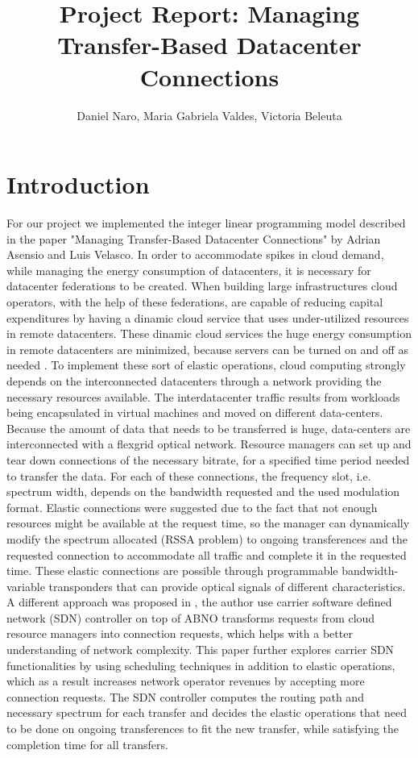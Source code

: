 \documentclass[11pt,a4paper]{article}
\title{Project Report: Managing Transfer-Based Datacenter Connections}
\author{Daniel Naro, Maria Gabriela Valdes, Victoria Beleuta}
\begin{document}
\maketitle
\section{Introduction}

For our project we implemented the integer linear programming model described in the paper "Managing Transfer-Based Datacenter Connections" by Adrian Asensio and Luis Velasco. In order to accommodate spikes in cloud demand, while managing the energy consumption of datacenters, it is necessary for datacenter federations to be created. When building large infrastructures cloud operators, with the help of these federations, are capable of reducing capital expenditures by having a dinamic cloud service that uses under-utilized resources in remote datacenters. These dinamic cloud services the huge energy consumption in remote datacenters are minimized, because servers can be turned on and off as needed . To implement these sort of elastic operations, cloud computing strongly depends on the interconnected datacenters through a network providing the necessary resources available. The interdatacenter traffic results from workloads being encapsulated in virtual machines and moved on different data-centers. Because the amount of data that needs to be transferred is huge, data-centers are interconnected with a flexgrid optical network. Resource managers can set up and tear down connections of the necessary bitrate, for a specified time period needed to transfer the data. For each of these connections, the frequency slot, i.e. spectrum width, depends on the bandwidth requested and the used modulation format. Elastic connections were suggested due to the fact that not enough resources might be available at the request time, so the manager can dynamically modify the spectrum allocated (RSSA problem)  to ongoing transferences and the requested connection to accommodate all traffic and complete it in the requested time. These elastic connections are possible through programmable bandwidth-variable transponders that can provide optical signals of different characteristics.\\

A different approach was proposed in \cite{1}, the author use carrier software defined network (SDN) controller on top of ABNO transforms requests from cloud resource managers into connection requests, which helps with a better understanding of network complexity. This paper further explores carrier SDN functionalities by using scheduling techniques in addition to elastic operations, which as a result increases network operator revenues by accepting more connection requests. The SDN controller computes the routing path and necessary spectrum for each transfer and decides the elastic operations that need to be done on ongoing transferences to fit the new transfer, while satisfying the completion time for all transfers.\\
\end{document}
